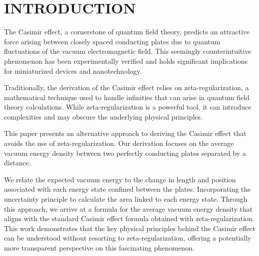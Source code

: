 \section{INTRODUCTION}


The Casimir effect, a cornerstone of quantum field theory, predicts an attractive force arising between closely 
spaced conducting plates due to quantum fluctuations of the vacuum electromagnetic field. 
This seemingly counterintuitive phenomenon has been experimentally verified and holds significant 
implications for miniaturized devices and nanotechnology.

Traditionally, the derivation of the Casimir effect relies on zeta-regularization, 
a mathematical technique used to handle infinities that can arise in quantum field theory calculations. 
While zeta-regularization is a powerful tool, it can introduce complexities and may obscure the underlying physical principles.

This paper presents an alternative approach to deriving the Casimir effect that avoids the use of zeta-regularization. 
Our derivation focuses on the average vacuum energy density between two perfectly conducting plates separated by a distance. 

We relate the expected vacuum energy to the change in length and position associated with each energy state confined between the plates. 
Incorporating the uncertainty principle to calculate the area linked to each energy state.
Through this approach, we arrive at a formula for the average vacuum energy density 
that aligns with the standard Casimir effect formula obtained with zeta-regularization. 
This work demonstrates that the key physical principles behind the Casimir effect can be understood without resorting to zeta-regularization, 
offering a potentially more transparent perspective on this fascinating phenomenon.

